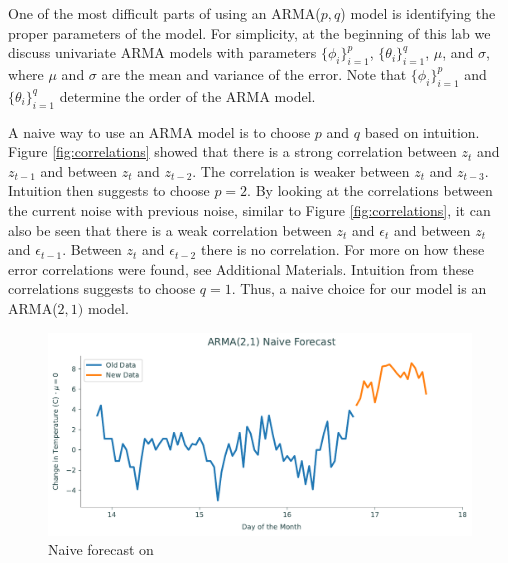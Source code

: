 One of the most difficult parts of using an ARMA($p,q$) model is identifying the proper parameters of the model.
For simplicity, at the beginning of this lab we discuss univariate ARMA models with parameters $\{\phi_i\}_{i=1}^p$, $\{\theta_i\}_{i=1}^q$, $\mu$, and $\sigma$, where $\mu$ and $\sigma$ are the mean and variance of the error.
Note that $\{\phi_i\}_{i=1}^p$ and $\{\theta_i\}_{i=1}^q$ determine the order of the ARMA model.

A naive way to use an ARMA model is to choose $p$ and $q$ based on intuition.
Figure \ref{fig:correlations} showed that there is a strong correlation between $z_t$ and $z_{t-1}$ and between $z_t$ and $z_{t-2}$.
The correlation is weaker between $z_t$ and $z_{t-3}$.
Intuition then suggests to choose $p=2$.
By looking at the correlations between the current noise with previous noise, similar to Figure \ref{fig:correlations}, it can also be seen that there is a weak correlation between $z_t$ and $\epsilon_t$ and between $z_t$ and $\epsilon_{t-1}$.
Between $z_t$ and $\epsilon_{t-2}$ there is no correlation.
For more on how these error correlations were found, see Additional Materials.
Intuition from these correlations suggests to choose $q=1$.
Thus, a naive choice for our model is an ARMA($2,1)$ model.

\begin{figure}[H]
\centering
\includegraphics[width=\textwidth]{figures/naive.pdf}
\caption{Naive forecast on }
\label{fig:ARMA:naive}
\end{figure}

